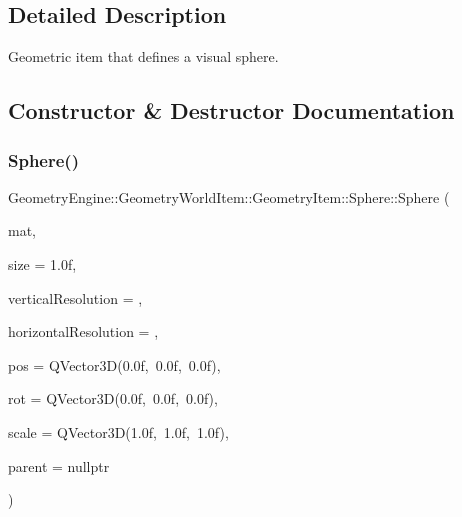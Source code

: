 \subsection{Detailed Description}
Geometric item that defines a visual sphere. 

\subsection{Constructor \& Destructor Documentation}
\mbox{\label{class_geometry_engine_1_1_geometry_world_item_1_1_geometry_item_1_1_sphere_a347e98690182023f565422548d4a6b9f}} 
\subsubsection{\texorpdfstring{Sphere()}{Sphere()}\hspace{0.1cm}{\footnotesize\ttfamily [1/2]}}
{\footnotesize\ttfamily Geometry\+Engine\+::\+Geometry\+World\+Item\+::\+Geometry\+Item\+::\+Sphere\+::\+Sphere (\begin{DoxyParamCaption}\item[{const \mbox{\hyperlink{class_geometry_engine_1_1_geometry_material_1_1_material}{Geometry\+Material\+::\+Material}} \&}]{mat,  }\item[{float}]{size = {\ttfamily 1.0f},  }\item[{int}]{vertical\+Resolution = {},  }\item[{int}]{horizontal\+Resolution = {},  }\item[{const Q\+Vector3D \&}]{pos = {\ttfamily QVector3D(0.0f,~0.0f,~0.0f)},  }\item[{const Q\+Vector3D \&}]{rot = {\ttfamily QVector3D(0.0f,~0.0f,~0.0f)},  }\item[{const Q\+Vector3D \&}]{scale = {\ttfamily QVector3D(1.0f,~1.0f,~1.0f)},  }\item[{\mbox{\hyperlink{class_geometry_engine_1_1_geometry_world_item_1_1_world_item}{World\+Item}} $\ast$}]{parent = {\ttfamily nullptr} }\end{DoxyParamCaption})}

